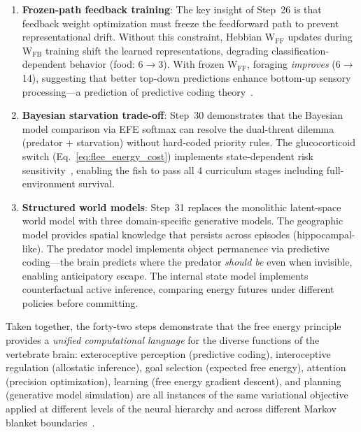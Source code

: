 \documentclass[11pt,a4paper]{article}
\begin{document}
\begin{enumerate}[nosep]
    fundamental perceptual challenge: distinguishing spatially extended
    obstacles from point-like food and enemy entities.
    This mirrors biological ``size tuning'' in tectal neurons that
    distinguish looming predators from small prey~\cite{temizer2015}.
    The improvement from 55\% to 100\% environment classification
    demonstrates that explicit spatial statistics complement raw
    pixel-level features.
  \item \textbf{Frozen-path feedback training}: The key insight of
    Step~26 is that feedback weight optimization must freeze the
    feedforward path to prevent representational drift.
    Without this constraint, Hebbian W$_\text{FF}$ updates during
    W$_\text{FB}$ training shift the learned representations, degrading
    classification-dependent behavior (food: 6$\to$3).
    With frozen W$_\text{FF}$, foraging \emph{improves} (6$\to$14),
    suggesting that better top-down predictions enhance bottom-up
    sensory processing---a prediction of predictive coding
    theory~\cite{rao1999,clark2013}.
  \item \textbf{Bayesian starvation trade-off}: Step~30 demonstrates
    that the Bayesian model comparison via EFE softmax can resolve
    the dual-threat dilemma (predator + starvation) without
    hard-coded priority rules.  The glucocorticoid switch
    (Eq.~\ref{eq:flee_energy_cost}) implements state-dependent risk
    sensitivity~\cite{lima1990}, enabling the fish to pass all 4
    curriculum stages including full-environment survival.
  \item \textbf{Structured world models}: Step~31 replaces the
    monolithic latent-space world model with three domain-specific
    generative models.  The geographic model provides spatial
    knowledge that persists across episodes (hippocampal-like).
    The predator model implements object permanence via predictive
    coding---the brain predicts where the predator \emph{should be}
    even when invisible, enabling anticipatory escape.
    The internal state model implements counterfactual active inference,
    comparing energy futures under different policies before committing.
\end{enumerate}

Taken together, the forty-two steps demonstrate that the free energy
principle provides a \emph{unified computational language} for the
diverse functions of the vertebrate brain: exteroceptive perception
(predictive coding), interoceptive regulation (allostatic inference),
goal selection (expected free energy), attention (precision optimization),
learning (free energy gradient descent), and planning (generative model
simulation) are all instances of the same variational objective
applied at different levels of the neural hierarchy and across different
Markov blanket boundaries~\cite{friston2010,parr2022}.
\end{document}
